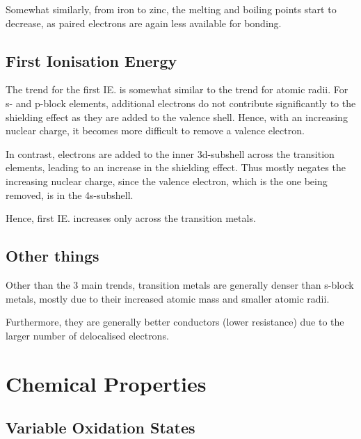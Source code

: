 			Somewhat similarly, from iron to zinc, the melting and boiling points start to decrease, as paired electrons are again less
			available for bonding.



		\subsection{First Ionisation Energy}

			The trend for the first IE. is somewhat similar to the trend for atomic radii. For s- and p-block elements, additional electrons
			do not contribute significantly to the shielding effect as they are added to the valence shell. Hence, with an increasing nuclear
			charge, it becomes more difficult to remove a valence electron.


			In contrast, electrons are added to the inner 3d-subshell across the transition elements, leading to an increase in the shielding
			effect. Thus mostly negates the increasing nuclear charge, since the valence electron, which is the one being removed, is in the
			4s-subshell.

			Hence, first IE. increases only  across the transition metals.



		\subsection{Other things}

			Other than the 3 main trends, transition metals are generally denser than s-block metals, mostly due to their increased atomic
			mass and smaller atomic radii.

			Furthermore, they are generally better conductors (lower resistance) due to the larger number of delocalised electrons.





	\pagebreak
	\section{Chemical Properties}

		\subsection{Variable Oxidation States}

